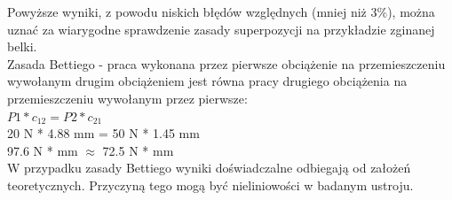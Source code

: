 \documentclass[11pt]{article}
\begin{document}
Powyższe wyniki, z powodu niskich błędów względnych (mniej niż $3\%$), można uznać za wiarygodne sprawdzenie zasady superpozycji na przykładzie zginanej belki.\\

Zasada Bettiego - praca wykonana przez pierwsze obciążenie na przemieszczeniu wywołanym drugim obciążeniem jest równa pracy drugiego obciążenia na przemieszczeniu wywołanym przez pierwsze:\\
$P1 * c_{12} = P2 * c_{21}$\\
20 N * 4.88 mm = 50 N * 1.45 mm\\
97.6 N * mm $\approx$ 72.5 N * mm\\
W przypadku zasady Bettiego wyniki doświadczalne odbiegają od założeń teoretycznych. Przyczyną tego mogą być nieliniowości w badanym ustroju.\\\\
\end{document}
